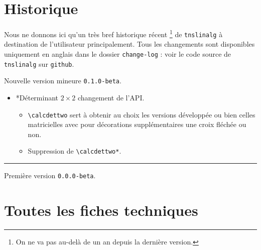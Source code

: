 \documentclass[12pt,a4paper]{article}
\makeatletter
\theoremstyle{definition}
\newcommand\topic{\@ifstar{\@topic@star}{\@topic@no@star}}
\newcommand\@topic@no@star[1]{%
    \textbf{\textsc{#1}.}%
}
\newcommand\@topic@star[1]{%
    \textbf{\textsc{#1} :}%
}
\newcommand\env[1]{\texttt{#1}}
\newcommand\macro[1]{\env{\textbackslash{}#1}}
\newcommand\separation{
    \medskip
    \hfill\rule{0.5\textwidth}{0.75pt}\hfill
    \medskip
}
\makeatother
\begin{document}
\section{Historique}

Nous ne donnons ici qu'un très bref historique récent
\footnote{
	On ne va pas au-delà de un an depuis la dernière version.
}
de \verb+tnslinalg+ à destination de l'utilisateur principalement.
Tous les changements sont disponibles uniquement en anglais dans le dossier \verb+change-log+ : voir le code source de \verb+tnslinalg+ sur \verb+github+.

\begin{description}

    \medskip
    \item[2020-08-27] Nouvelle version mineure \verb+0.1.0-beta+.
    
    \begin{itemize}[itemsep=.5em]
        \item \topic*{Déterminant $2 \times 2$} changement de l'API.
        \begin{itemize}[itemsep=.5em]
            \item \macro{calcdettwo} sert à obtenir au choix les versions développée ou bien celles matricielles avec pour décorations supplémentaires une croix fléchée ou non.
    
            \item Suppression de \macro{calcdettwo*}.
        \end{itemize}
    
    
    \end{itemize}
    
    \separation
    


    \medskip
    \item[2020-07-10] Première version \verb+0.0.0-beta+.

\end{description}


\newpage
\section{Toutes les fiches techniques} \label{techincal-ids}
\end{document}
